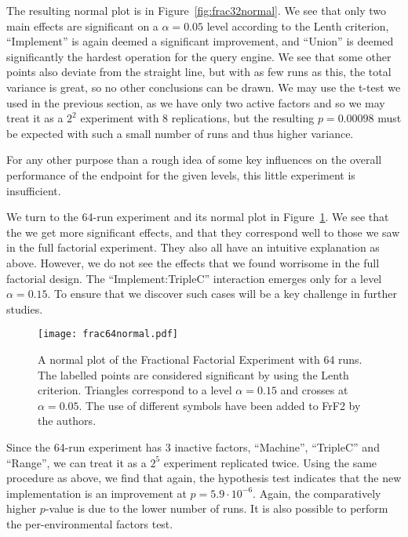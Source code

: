 \documentclass{llncs}
\begin{document}
The resulting normal plot is in Figure~\ref{fig:frac32normal}. We see
that only two main effects are significant on a $\alpha = 0.05$ level
according to the Lenth criterion, ``Implement'' is again deemed a
significant improvement, and ``Union'' is deemed significantly the
hardest operation for the query engine. We see that some other points
also deviate from the straight line, but with as few runs as this, the
total variance is great, so no other conclusions can be drawn. We may
use the t-test we used in the previous section, as we have only two
active factors and so we may treat it as a $2^2$ experiment with 8
replications, but the resulting $p = 0.00098$ must be expected with
such a small number of runs and thus higher variance.


For any other purpose than a rough idea of some key influences on the
overall performance of the endpoint for the given levels, this little
experiment is insufficient.

We turn to the 64-run experiment and its normal plot in
Figure~\ref{fig:frac64normal}. We see that the we get more significant
effects, and that they correspond well to those we saw in the full
factorial experiment. They also all have an intuitive explanation as
above. However, we do not see the effects that we found worrisome in
the full factorial design. The ``Implement:TripleC'' interaction
emerges only for a level $\alpha=0.15$. To ensure that we discover
such cases will be a key challenge in further studies.

\begin{figure}[h!]
  \centerline{%
    \texttt{[image: frac64normal.pdf]}}
  \caption{A normal plot of the Fractional Factorial Experiment with
    64 runs. The labelled points are considered significant by using
    the Lenth criterion. Triangles correspond to a level $\alpha=0.15$
    and crosses at $\alpha=0.05$. The use of different symbols have
    been added to FrF2 by the authors.}\label{fig:frac64normal}
\end{figure}

Since the 64-run experiment has 3 inactive factors, ``Machine'',
``TripleC'' and ``Range'', we can treat it as a $2^5$ experiment
replicated twice. Using the same procedure as above, we find that
again, the hypothesis test indicates that the new implementation is an
improvement at $p = 5.9 \cdot 10^{-6}$. Again, the comparatively
higher $p$-value is due to the lower number of runs. It is also possible
to perform the per-environmental factors test.
\end{document}
